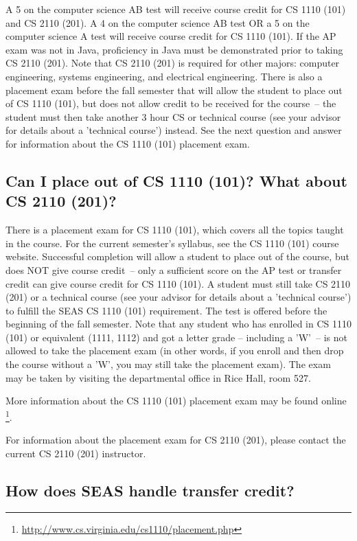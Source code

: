 \documentclass[10pt,letter]{book}
\newcommand{\myurl}[1]{\footnote{\scriptsize\url{#1}}}
\begin{document}
A 5 on the computer science AB test will receive course credit for CS
1110 (101) and CS 2110 (201). A 4 on the computer science AB test OR a
5 on the computer science A test will receive course credit for CS
1110 (101). If the AP exam was not in Java, proficiency in Java must
be demonstrated prior to taking CS 2110 (201). Note that CS 2110 (201)
is required for other majors: computer engineering, systems
engineering, and electrical engineering. There is also a placement
exam before the fall semester that will allow the student to place out
of CS 1110 (101), but does not allow credit to be received for the
course~-- the student must then take another 3 hour CS or technical
course (see your advisor for details about a 'technical course')
instead. See the next question and answer for information about the CS
1110 (101) placement exam.

\subsection{Can I place out of CS 1110 (101)? What about CS 2110
  (201)?}
\label{101placement}

There is a placement exam for CS 1110 (101), which covers all the
topics taught in the course. For the current semester's syllabus, see
the CS 1110 (101) course website. Successful completion will allow a
student to place out of the course, but does NOT give course credit~--
only a sufficient score on the AP test or transfer credit can give
course credit for CS 1110 (101). A student must still take CS 2110
(201) or a technical course (see your advisor for details about a
'technical course') to fulfill the SEAS CS 1110 (101) requirement. The
test is offered before the beginning of the fall semester. Note that
any student who has enrolled in CS 1110 (101) or equivalent (1111,
1112) and got a letter grade – including a 'W'~-- is not allowed to
take the placement exam (in other words, if you enroll and then drop
the course without a 'W', you may still take the placement exam). The
exam may be taken by visiting the departmental office in Rice Hall,
room 527.

More information about the CS 1110 (101) placement exam may be found online
\myurl{http://www.cs.virginia.edu/cs1110/placement.php}.

For information about the placement exam for CS 2110 (201), please
contact the current CS 2110 (201) instructor.

\subsection{How does SEAS handle transfer credit?}
\end{document}
